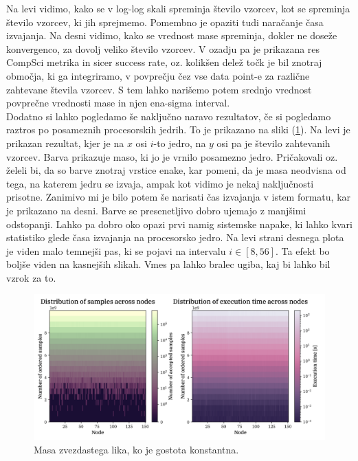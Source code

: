 \documentclass[a4paper]{article}
\begin{document}
Na levi vidimo, kako se v log-log skali spreminja število vzorcev, kot se spreminja število vzorcev, ki jih 
sprejmemo. Pomembno je opaziti tudi naračanje časa izvajanja. Na desni vidimo, kako se vrednost mase spreminja,
dokler ne doseže konvergenco, za dovolj veliko število vzorcev. V ozadju pa je prikazana res CompSci metrika in 
sicer success rate, oz. kolikšen delež točk je bil znotraj območja, ki ga integriramo, v povprečju čez vse data 
point-e za različne zahtevane števila vzorcev. S tem lahko narišemo potem srednjo vrednost povprečne vrednosti mase
in njen ena-sigma interval. \\

Dodatno si lahko pogledamo še naključno naravo rezultatov, če si pogledamo raztros po posameznih procesorskih
jedrih. To je prikazano na sliki (\ref{fig:mass_const_heatmaps}). Na levi je prikazan rezultat, kjer je na $x$ 
osi $i$-to jedro, na $y$ osi pa je število zahtevanih vzorcev. Barva prikazuje maso, ki jo je vrnilo posamezno
jedro. Pričakovali oz. želeli bi, da so barve znotraj vrstice enake, kar pomeni, da je masa neodvisna od tega,
na katerem jedru se izvaja, ampak kot vidimo je nekaj naključnosti prisotne. Zanimivo mi je bilo potem še 
narisati čas izvajanja v istem formatu, kar je prikazano na desni. Barve se presenetljivo dobro ujemajo z manjšimi 
odstopanji. Lahko pa dobro oko opazi prvi namig sistemske napake, ki lahko kvari statistiko glede časa izvajanja 
na procesorsko jedro. Na levi strani desnega plota je viden malo temnejši pas, ki se pojavi na intervalu 
$i \in [8, 56]$. Ta efekt bo boljše viden na kasnejših slikah. Vmes pa lahko bralec ugiba, kaj bi lahko bil vzrok
za to. \\

\begin{figure}[H]
    \centering
    \includegraphics[width=\textwidth]{../StarShapes/Images/mass_const_heatmaps.png}
    \caption{Masa zvezdastega lika, ko je gostota konstantna.}
    \label{fig:mass_const_heatmaps}
\end{figure}
\end{document}
